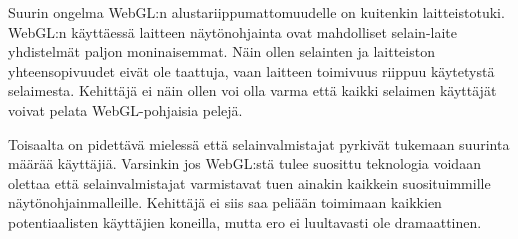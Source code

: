 Suurin ongelma WebGL:n alustariippumattomuudelle on kuitenkin laitteistotuki. WebGL:n käyttäessä laitteen näytönohjainta ovat mahdolliset selain-laite yhdistelmät paljon moninaisemmat. Näin ollen selainten ja laitteiston yhteensopivuudet eivät ole taattuja, vaan laitteen toimivuus riippuu käytetystä selaimesta\cite{mozillaBlacklist}\cite{webgl_supported}. Kehittäjä ei näin ollen voi olla varma että kaikki selaimen käyttäjät voivat pelata WebGL-pohjaisia pelejä.

Toisaalta on pidettävä mielessä että selainvalmistajat pyrkivät tukemaan suurinta määrää käyttäjiä. Varsinkin jos WebGL:stä tulee suosittu teknologia voidaan olettaa että selainvalmistajat varmistavat tuen ainakin kaikkein suosituimmille näytönohjainmalleille. Kehittäjä ei siis saa peliään toimimaan kaikkien potentiaalisten käyttäjien koneilla, mutta ero ei luultavasti ole dramaattinen.